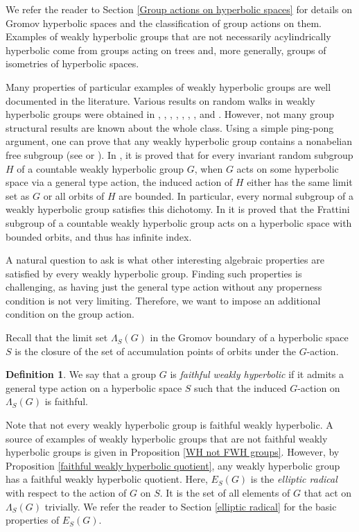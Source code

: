 \documentclass[11pt,letterpaper]{article}
\theoremstyle{definition}
\newtheorem{defn}[thm]{Definition}
\theoremstyle{remark}
\begin{document}
We refer the reader to Section \ref{Group actions on hyperbolic spaces} for details on Gromov hyperbolic spaces and the classification of group actions on them.
Examples of weakly hyperbolic groups that are not necessarily acylindrically hyperbolic come from groups acting on trees and, more generally, groups of isometries of hyperbolic spaces. 

Many properties of particular examples of weakly hyperbolic groups are well documented in the literature. Various results on random walks in weakly hyperbolic groups were obtained in \cite{MT}, \cite{Sun}, \cite{BMSS}, \cite{AMS}, \cite{AS}, \cite{GTT22}, \cite{Cho}, and \cite{Hor}. However, not many group structural results are known about the whole class. Using a simple ping-pong argument, one can prove that any weakly hyperbolic group contains a nonabelian free subgroup (see \cite[8.2.F]{Gro87} or \cite[Thm. 2.7]{Ham}). In \cite{Osi17}, it is proved that for every invariant random subgroup $H$ of a countable weakly hyperbolic group $G$, when $G$ acts on some hyperbolic space via a general type action, the induced action of $H$ either has the same limit set as $G$ or all orbits of $H$ are bounded. In particular, every normal subgroup of a weakly hyperbolic group satisfies this dichotomy. In \cite[Thm 1.2]{GOR} it is proved that the Frattini subgroup of a countable weakly hyperbolic group acts on a hyperbolic space with bounded orbits, and thus has infinite index.

 A natural question to ask is what other interesting algebraic properties are satisfied by every weakly hyperbolic group. Finding such properties is challenging, as having just the general type action without any properness condition is not very limiting. Therefore, we want to impose an additional condition on the group action.

Recall that the limit set $\Lambda_S(G)$ in the Gromov boundary of a hyperbolic space $S$ is the closure of the set of accumulation points of orbits under the $G$-action. 

\begin{defn}
We say that a group $G$ is {\it faithful weakly hyperbolic} if it admits a general type action on a hyperbolic space $S$ such that the induced $G$-action on $\Lambda_S(G)$ is faithful. 
\end{defn}

Note that not every weakly hyperbolic group is faithful weakly hyperbolic. A source of examples of weakly hyperbolic groups that are not faithful weakly hyperbolic groups is given in Proposition \ref{WH not FWH groups}. However, by Proposition \ref{faithful weakly hyperbolic quotient}, any weakly hyperbolic group has a faithful weakly hyperbolic quotient. Here, $E_S(G)$ is the {\it elliptic radical} with respect to the action of $G$ on $S$. It is the set of all elements of $G$ that act on $\Lambda_S(G)$ trivially. We refer the reader to Section \ref{elliptic radical} for the basic properties of $E_S(G)$.
\end{document}
